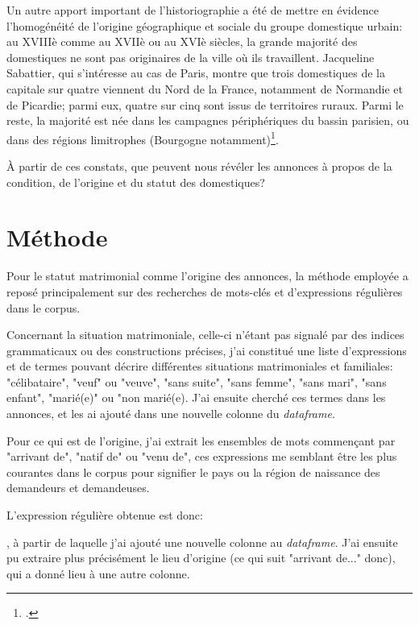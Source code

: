 Un autre apport important de l'historiographie a été de mettre en évidence l'homogénéité de l'origine géographique et sociale du groupe domestique urbain: au XVIIIè comme au XVIIè ou au XVIè siècles, la grande majorité des domestiques ne sont pas originaires de la ville où ils travaillent. Jacqueline Sabattier, qui s'intéresse au cas de Paris, montre que trois domestiques de la capitale sur quatre viennent du Nord de la France, notamment de Normandie et de Picardie; parmi eux, quatre sur cinq sont issus de territoires ruraux. Parmi le reste, la majorité est née dans les campagnes périphériques du bassin parisien, ou dans des régions limitrophes (Bourgogne notamment)\footcites[p.20-25]{sabattierFigaroSonMaitre1984}. 

À partir de ces constats, que peuvent nous révéler les annonces à propos de la condition, de l'origine et du statut des domestiques? 


\section{Méthode}

Pour le statut matrimonial comme l'origine des annonces, la méthode employée a reposé principalement sur des recherches de mots-clés et d'expressions régulières dans le corpus. 

Concernant la situation matrimoniale, celle-ci n'étant pas signalé par des indices grammaticaux ou des constructions précises, j'ai constitué une liste d'expressions et de termes pouvant décrire différentes situations matrimoniales et familiales: "célibataire", "veuf" ou "veuve", "sans suite", "sans femme", "sans mari", "sans enfant", "marié(e)" ou "non marié(e). J'ai ensuite cherché ces termes dans les annonces, et les ai ajouté dans une nouvelle colonne du \textit{dataframe}.


Pour ce qui est de l'origine, j'ai extrait les ensembles de mots commençant par "arrivant de", "natif de" ou "venu de", ces expressions me semblant être les plus courantes dans le corpus pour signifier le pays ou la région de naissance des demandeurs et demandeuses. 

L'expression régulière obtenue est donc:

 , à partir de laquelle j'ai ajouté une nouvelle colonne au \textit{dataframe}. J'ai ensuite pu extraire plus précisément le lieu d'origine (ce qui suit "arrivant de..." donc), qui a donné lieu à une autre colonne. 


